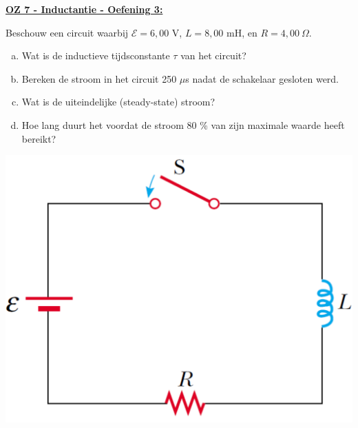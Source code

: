 \textbf{\underline{OZ 7 - Inductantie - Oefening 3:}}
\vspace{0.5cm}

Beschouw een circuit waarbij $ \mathcal{E} = 6,00 $ V, $ L = 8,00 $ mH, en $ R = 4,00 \ \Omega $.

\vspace{0.3cm}
\begin{minipage}{.75\textwidth}
    \begin{enumerate}[(a)]
        \item Wat is de inductieve tijdsconstante $ \tau $ van het circuit?
        \item Bereken de stroom in het circuit 250 $ \mu $s nadat de schakelaar gesloten werd.
        \item Wat is de uiteindelijke (steady-state) stroom?
        \item Hoe lang duurt het voordat de stroom 80 \% van zijn maximale waarde heeft bereikt?
    \end{enumerate}
\end{minipage}
\hspace{0.75cm}\begin{minipage}{.21\textwidth}
    \vspace{-0.5cm}\begin{center}
        \includegraphics[scale = 0.28]{oz07/resources/oef-1-opgave.png}
    \end{center}
\end{minipage}
\vspace{0.3cm}


